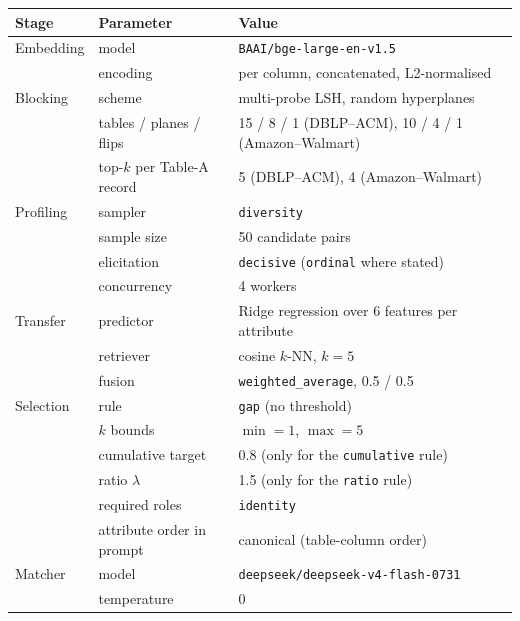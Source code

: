 \documentclass[11pt]{article}
\begin{document}
\begin{table}[h]
\centering
\begin{tabular}{lll}
\toprule
Stage & Parameter & Value \\
\midrule
Embedding   & model                       & \texttt{BAAI/bge-large-en-v1.5} \\
            & encoding                    & per column, concatenated, L2-normalised \\
\midrule
Blocking    & scheme                      & multi-probe LSH, random hyperplanes \\
            & tables / planes / flips     & 15 / 8 / 1 (DBLP--ACM), 10 / 4 / 1 (Amazon--Walmart) \\
            & top-$k$ per Table-A record  & 5 (DBLP--ACM), 4 (Amazon--Walmart) \\
\midrule
Profiling   & sampler                     & \texttt{diversity} \\
            & sample size                 & 50 candidate pairs \\
            & elicitation                 & \texttt{decisive} (\texttt{ordinal} where stated) \\
            & concurrency                 & 4 workers \\
\midrule
Transfer    & predictor                   & Ridge regression over 6 features per attribute \\
            & retriever                   & cosine $k$-NN, $k = 5$ \\
            & fusion                      & \texttt{weighted\_average}, 0.5 / 0.5 \\
\midrule
Selection   & rule                        & \texttt{gap} (no threshold) \\
            & $k$ bounds                  & $\min = 1$, $\max = 5$ \\
            & cumulative target           & 0.8 (only for the \texttt{cumulative} rule) \\
            & ratio $\lambda$             & 1.5 (only for the \texttt{ratio} rule) \\
            & required roles              & \texttt{identity} \\
            & attribute order in prompt   & canonical (table-column order) \\
\midrule
Matcher     & model                       & \texttt{deepseek/deepseek-v4-flash-0731} \\
            & temperature                 & 0 \\

\end{tabular}
\end{table}
\end{document}
